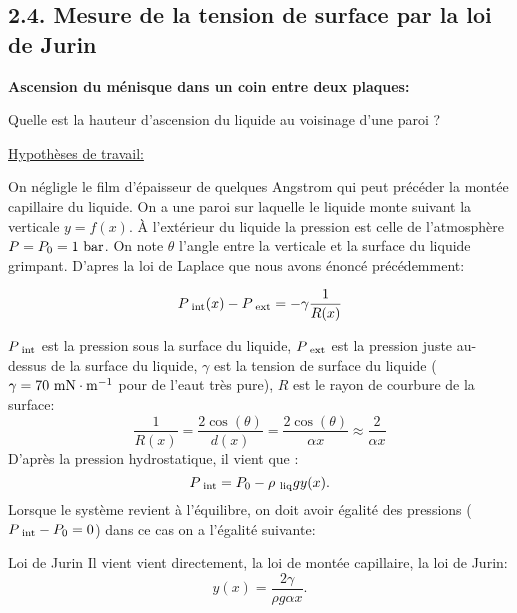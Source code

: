 \documentclass[french, a4paper, 10pt, twocolumn, landscape]{article}
\begin{document}
\subsection*{2.4. Mesure de la tension de surface par la loi de Jurin}

\textbf{Ascension du m{\'e}nisque dans un coin entre deux plaques:}\medskip

Quelle est la hauteur d'ascension du liquide au voisinage d'une paroi ?


\underline{Hypothèses de travail:}\medskip

On n{\'e}gligle le film d'{\'e}paisseur de quelques Angstrom qui peut pr{\'e}c{\'e}der la mont{\'e}e capillaire du liquide. On a une paroi sur laquelle le liquide monte suivant la verticale $y = f (x)
.$ {\`A} l'ext{\'e}rieur du liquide la pression est celle de l'atmosph{\`e}re $P = P_0 = 1 \rm~{bar}$. On note $\theta$ l'angle entre la verticale et la surface du liquide grimpant. D'apres la loi de Laplace que nous avons {\'e}nonc{\'e} pr{\'e}c{\'e}demment:

\begin{equation}
  P_{\rm~{int}} (x) - P_{\rm~{ext}} = - \gamma \frac{1}{R (x)}
  \label{eq:laplaceascension}
\end{equation}


 $P_{\rm~{int}}$ est la pression sous la surface du liquide, $P_{\rm~{ext}}$ est la pression juste au-dessus de la surface du liquide, $\gamma$ est la tension de surface du liquide ($\gamma=70~\rm mN\cdot m^{-1}$ pour de l'eaut très pure), $R$ est le rayon de courbure de la surface:
\begin{equation} 
  \dfrac{1}{R(x)} = \dfrac{2 \cos(\theta)}{d (x)} = \dfrac{2 \cos(\theta)}{\alpha x}\approx \dfrac{2}{\alpha x} 
\end{equation}
D'après la pression hydrostatique, il vient que :
\begin{equation}
  P_{\rm~{int}} = P_0 - \rho_{\rm~{liq}}gy(x) .
\end{equation}
Lorsque le syst{\`e}me revient {\`a} l'{\'e}quilibre, on doit avoir
{\'e}galit{\'e} des pressions ($P_{\rm~{int}} - P_0 = 0$) dans ce cas on a
l'{\'e}galit{\'e} suivante:

\begin{definition}{Loi de Jurin}  
  Il vient vient directement, la loi de mont{\'e}e capillaire, la loi de
  Jurin:
  \begin{equation}
    y (x) = \frac{2 \gamma}{\rho g \alpha x} . \label{eq:jurin}
  \end{equation}
\end{definition}
\end{document}
